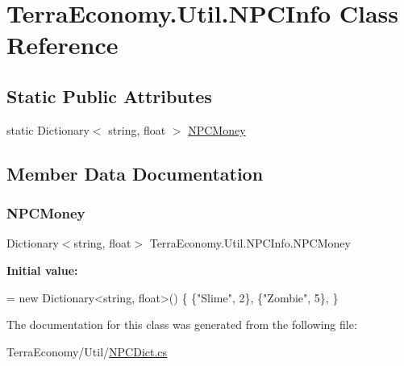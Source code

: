 \hypertarget{class_terra_economy_1_1_util_1_1_n_p_c_info}{}\section{Terra\+Economy.\+Util.\+N\+P\+C\+Info Class Reference}
\label{class_terra_economy_1_1_util_1_1_n_p_c_info}
\subsection*{Static Public Attributes}
\begin{DoxyCompactItemize}
\item 
static Dictionary$<$ string, float $>$ \hyperlink{class_terra_economy_1_1_util_1_1_n_p_c_info_aff5c6d5661a22d9b03d855928c3ea996}{N\+P\+C\+Money}
\end{DoxyCompactItemize}


\subsection{Member Data Documentation}
\mbox{\label{class_terra_economy_1_1_util_1_1_n_p_c_info_aff5c6d5661a22d9b03d855928c3ea996}} 
\subsubsection{\texorpdfstring{N\+P\+C\+Money}{NPCMoney}}
{\footnotesize\ttfamily Dictionary$<$string, float$>$ Terra\+Economy.\+Util.\+N\+P\+C\+Info.\+N\+P\+C\+Money\hspace{0.3cm}{\ttfamily [static]}}

{\bfseries Initial value\+:}
\begin{DoxyCode}
= \textcolor{keyword}{new} Dictionary<string, float>()
        \{
            \{\textcolor{stringliteral}{"Slime"}, 2\},
            \{\textcolor{stringliteral}{"Zombie"}, 5\},
        \}
\end{DoxyCode}


The documentation for this class was generated from the following file\+:\begin{DoxyCompactItemize}
\item 
Terra\+Economy/\+Util/\hyperlink{_n_p_c_dict_8cs}{N\+P\+C\+Dict.\+cs}\end{DoxyCompactItemize}
